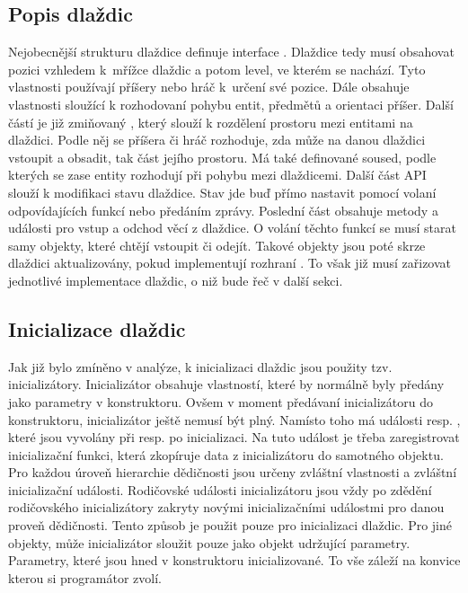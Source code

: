 \subsection{Popis dlaždic}
Nejobecnější strukturu dlaždice definuje interface . Dlaždice tedy musí obsahovat pozici vzhledem
k~mřížce dlaždic a potom level, ve kterém se nachází. Tyto vlastnosti používají příšery nebo hráč k~určení
své pozice. Dále obsahuje vlastnosti sloužící k rozhodovaní pohybu entit, předmětů a orientaci příšer. Další částí
je již zmiňovaný , který slouží k rozdělení prostoru mezi entitami na dlaždici. Podle něj se 
příšera či hráč rozhoduje, zda může na danou dlaždici vstoupit a obsadit, tak část jejího prostoru. Má také definované
soused, podle kterých se zase entity rozhodují při pohybu mezi dlaždicemi. Další část API slouží k modifikaci stavu dlaždice.
Stav jde buď přímo nastavit pomocí volaní odpovídajících funkcí nebo předáním zprávy. Poslední
část obsahuje metody a události pro vstup a odchod věcí z dlaždice. O volání těchto  funkcí se musí starat samy objekty,
které chtějí vstoupit či odejít. Takové objekty jsou poté skrze dlaždici aktualizovány, pokud implementují rozhraní
. To však již musí zařizovat jednotlivé implementace dlaždic, o niž bude řeč v další sekci.

\subsection{Inicializace dlaždic}
Jak již bylo zmíněno v analýze, k inicializaci dlaždic jsou použity tzv. inicializátory. Inicializátor
obsahuje vlastností, které by normálně byly předány jako parametry v konstruktoru. Ovšem v moment předávaní
inicializátoru do konstruktoru, inicializátor ještě nemusí být plný. Namísto toho má události 
resp. , které jsou vyvolány při resp. po inicializaci. Na tuto událost je třeba zaregistrovat
inicializační funkci, která zkopíruje data z inicializátoru do samotného objektu. Pro každou úroveň hierarchie
dědičnosti jsou určeny zvláštní vlastnosti a zvláštní inicializační události. Rodičovské události  inicializátoru jsou vždy
po zdědění rodičovského inicializátory zakryty novými inicializačními událostmi pro danou proveň dědičnosti.
Tento způsob je použit pouze pro inicializaci dlaždic. Pro jiné objekty, může inicializátor sloužit pouze jako 
objekt udržující parametry. Parametry, které jsou hned v konstruktoru inicializované. To vše záleží na konvice kterou si
programátor zvolí.

